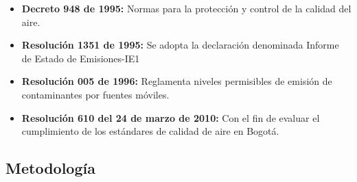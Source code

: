 \documentclass[a4paper, 11pt, oneside]{article}
\theoremstyle{definition}
\theoremstyle{remark}
\begin{document}
\begin{enumerate}[I]
\begin{itemize}
    \item\textbf{Decreto 948 de 1995: } Normas para la protección y control de la 	   calidad del aire.
    \item\textbf{Resolución 1351 de 1995: } Se adopta la declaración denominada 	 Informe de Estado de Emisiones-IE1
    \item\textbf{Resolución 005 de 1996: } Reglamenta niveles permisibles de 		emisión de contaminantes por fuentes móviles.
    \item\textbf{Resolución 610 del 24 de marzo de 2010: } Con el fin de evaluar 	 el cumplimiento de los estándares de calidad de aire en Bogotá.
\end{itemize}
\end{enumerate}
\clearpage


\begin{center}
\section{Metodología}
\end{center}
\end{document}
